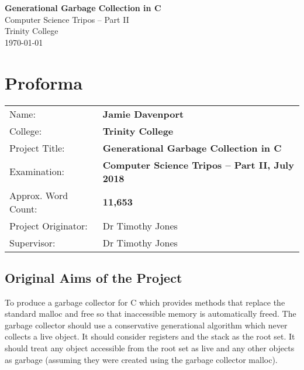 \documentclass[12pt,a4paper,twoside,openright]{report}
\begin{document}





\pagestyle{empty}


\vspace*{60mm}
\begin{center}
\LARGE
\textbf{Generational Garbage Collection in C} \\[5mm]
Computer Science Tripos -- Part II \\[5mm]
Trinity College \\[5mm]
\today  %
\end{center}


\pagestyle{plain}

\chapter*{Proforma}

{\large
\begin{tabular}{ll}
Name:               & \bf Jamie Davenport                       \\
College:            & \bf Trinity College                     \\
Project Title:      & \bf Generational Garbage Collection in C \\
Examination:        & \bf Computer Science Tripos -- Part II, July 2018  \\
Approx. Word Count:         & \bf 11,653\footnotemark  \\
Project Originator: & Dr Timothy Jones                    \\
Supervisor:         & Dr Timothy Jones                    \\ 
\end{tabular}
}


\section*{Original Aims of the Project}

To produce a garbage collector for C which provides methods that replace the standard malloc and free so that inaccessible memory is automatically freed. The garbage collector should use a conservative generational algorithm which never collects a live object. It should consider registers and the stack as the root set. It should treat any object accessible from the root set as live and any other objects as garbage (assuming they were created using the garbage collector malloc).
\end{document}
